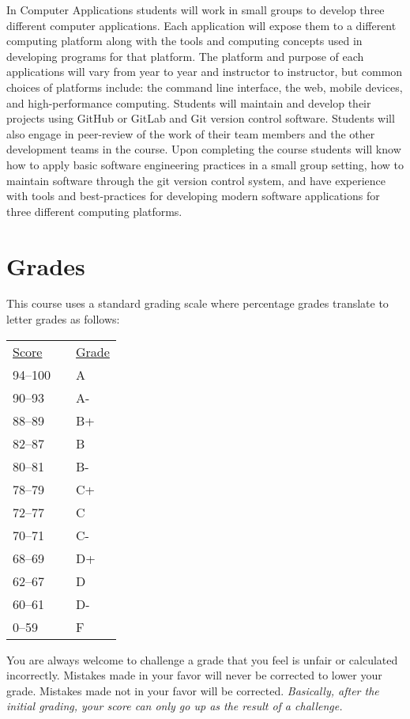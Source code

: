 \documentclass[10pt]{article}
\begin{document}
In Computer Applications students will work in small groups to develop three different computer applications.  Each application will expose them to a different computing platform along with the tools and computing concepts used in developing programs for that platform. The platform and purpose of each applications will vary from year to year and instructor to instructor, but common choices of platforms include: the command line interface, the web, mobile devices, and high-performance computing. Students will maintain and develop their projects using GitHub or GitLab and Git version control software. Students will also engage in peer-review of the work of their team members and the other development teams in the course. Upon completing the course students will know how to apply basic software engineering practices in a small group setting, how to maintain software through the git version control system, and have experience with tools and best-practices for developing modern software applications for three different computing platforms.

\section{Grades}

This course uses a standard grading scale where percentage grades translate to letter grades as follows:

\begin{center}
\begin{small}
\begin{tabular}{lcl}
\underline{Score} & & \underline{Grade} \\
94--100 & & A \\
90--93 & & A- \\
88--89 & & B+ \\
82--87 & & B \\
80--81 & & B- \\
78--79 & & C+ \\
72--77 & & C \\
70--71 & & C- \\
68--69 & & D+ \\
62--67 & & D \\
60--61 & & D- \\
0--59 & & F
\end{tabular}
\end{small}
\end{center}


You are always welcome to challenge a grade that you feel is unfair or calculated incorrectly.  Mistakes made in your favor will never be corrected to lower your grade.  Mistakes made not in your favor will be corrected.  \textit{Basically, after the initial grading, your score can only go up as the result of a challenge.}
\end{document}
